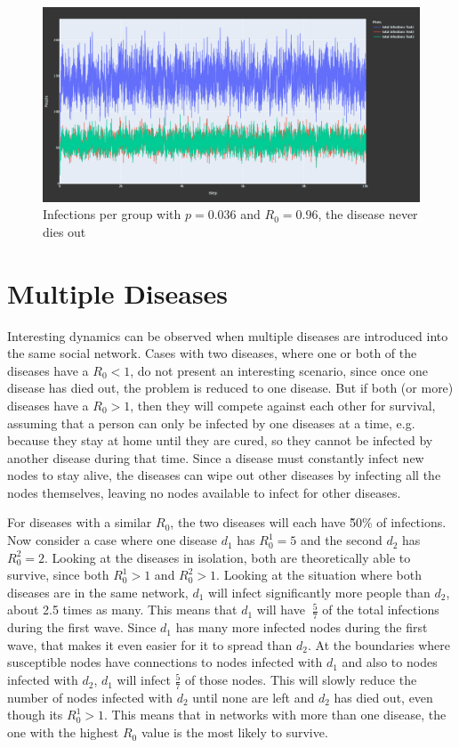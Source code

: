 \begin{figure}
    \centering
    \includegraphics[width=0.5\linewidth]{images/exp_subgroups.png}
    \caption{Infections per group with $p = 0.036$ and $R_0 = 0.96$, the disease never dies out}
    \label{fig:exp_subgroups}
\end{figure}


\section{Multiple Diseases}
Interesting dynamics can be observed when multiple diseases are introduced into the same social network. Cases with two diseases, where one or both of the diseases have a $R_0 < 1$, do not present an interesting scenario, since once one disease has died out, the problem is reduced to one disease. But if both (or more) diseases have a $R_0 > 1$, then they will compete against each other for survival, assuming that a person can only be infected by one diseases at a time, e.g. because they stay at home until they are cured, so they cannot be infected by another disease during that time. Since a disease must constantly infect new nodes to stay alive, the diseases can wipe out other diseases by infecting all the nodes themselves, leaving no nodes available to infect for other diseases.

For diseases with a similar $R_0$, the two diseases will each have \~50\% of infections. Now consider a case where one disease $d_1$ has $R_0^1=5$ and the second $d_2$ has $R_0^2=2$. Looking at the diseases in isolation, both are theoretically able to survive, since both $R_0^1 > 1$ and $R_0^2>1$. Looking at the situation where both diseases are in the same network, $d_1$ will infect significantly more people than $d_2$, about 2.5 times as many. This means that $d_1$ will have $~\frac{5}{7}$ of the total infections during the first wave. Since $d_1$ has many more infected nodes during the first wave, that makes it even easier for it to spread than $d_2$. At the boundaries where susceptible nodes have connections to nodes infected with $d_1$ and also to nodes infected with $d_2$, $d_1$ will infect $\frac{5}{7}$ of those nodes. This will slowly reduce the number of nodes infected with $d_2$ until none are left and $d_2$ has died out, even though its $R_0^1>1$. This means that in networks with more than one disease, the one  with the highest $R_0$ value is the most likely to survive.

